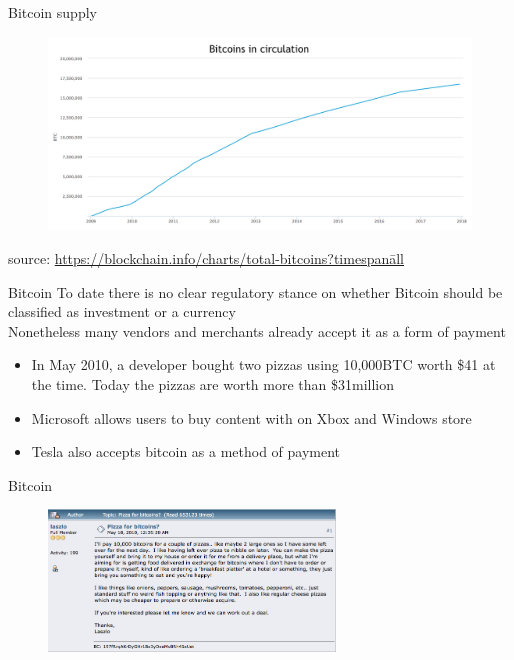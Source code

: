 \documentclass[9pt]{beamer}
\begin{document}

\begin{frame}{Bitcoin supply}
	\begin{figure}[]
		\centering
		\includegraphics  [scale=0.2]{Images/btc-circulation}
	\end{figure}
		\begin{scriptsize}
		source: \href{https://blockchain.info/charts/total-bitcoins?timespan=all}{https://blockchain.info/charts/total-bitcoins?timespan\=all}
	\end{scriptsize}
\end{frame}


\begin{frame}{Bitcoin}
	To date there is no clear regulatory stance on whether Bitcoin should be classified as investment or a currency \\ \vspace{3mm}
	Nonetheless many vendors and merchants already accept it as a form of payment
	\begin{itemize}
		\item In May 2010, a developer bought two pizzas using 10,000BTC worth \$41 at the time. Today the pizzas are worth more than \$31million
		\item Microsoft allows users to buy content with on Xbox and Windows store
		\item Tesla also accepts bitcoin as a method of payment
	\end{itemize}
\end{frame}


\begin{frame}{Bitcoin}
	\begin{figure}[]
		\centering
		\includegraphics  [width=3in]{Images/pizza1}
	\end{figure}
\end{frame}
\end{document}
